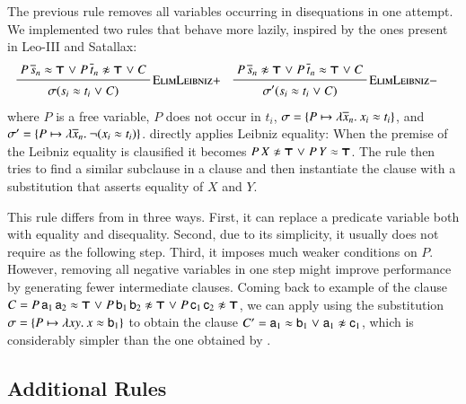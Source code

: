 The previous rule removes all variables occurring in disequations in one
attempt. We implemented two rules that behave more lazily, inspired by the ones present in Leo-III and
Satallax:
%
\begin{align*}
&\namedinference{ElimLeibniz$+$}
{P \, \tuplen{s} \eq \itrue \llor P \, \tuplen{t} \noteq \itrue \llor C}
{\sigmacl{s_i \eq t_i \llor C}}
&&
\namedinference{ElimLeibniz$-$}
{P \, \tuplen{s} \noteq \itrue \llor P \, \tuplen{t} \eq \itrue \llor C}
{\substcl{\sigma'}{s_i \eq t_i \llor C}}&
\end{align*}
%
where $P$ is a free variable, $P$ does not occur in $t_i$, $\sigma = \{ P
\mapsto \lambda \overline{x}_{n}.\> x_i \approx t_i \}$, and $\sigma' = \{ P \mapsto
\lambda \overline{x}_{n}.\> \neg (x_i \approx t_i) \}$.  directly applies
Leibniz equality: When the premise of the Leibniz equality is clausified it
becomes $P \, X \not\approx \pmb{\top} \mathrel\lor P \, Y \approx \pmb{\top}$. The rule then tries to find
a similar subclause in a clause and then instantiate the clause with a
substitution that asserts equality of $X$ and $Y$.


This rule differs from
 in three ways. First, it can replace a predicate variable
both with equality and disequality. Second, due to its simplicity, it usually
does not require  as the following step. Third, it imposes much
weaker conditions on $P$. However, removing all negative variables in one step
might improve performance  by generating fewer intermediate clauses.  Coming
back to example of the clause $C = P \, \mathsf{a}_1 \, \mathsf{a}_2 \approx \pmb{\top} \mathrel\lor
P \, \mathsf{b}_1 \, \mathsf{b}_2 \not\approx \pmb{\top} \mathrel\lor P \, \mathsf{c}_1 \, \mathsf{c}_2
\not\approx \pmb{\top}$, we can apply  using the substitution
$\sigma = \{ P \mapsto \lambda xy.\> x \approx \mathsf{b}_1 \}$ to obtain the clause $C' =
\mathsf{a}_1 \approx \mathsf{b}_1 \mathrel\lor \mathsf{a}_1 \not\approx \mathsf{c}_1$, which is considerably simpler than
the one obtained by .



\subsection{Additional Rules}
\label{subsect:bool:core}
 
